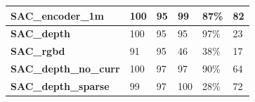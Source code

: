 \begin{table}[]
\begin{tabular}{l|l|l|l|l|l|}
    \multicolumn{1}{|l|}{\textbf{SAC\_encoder\_1m}}     & 100                                                                                         & 95                                                                                         & 99                                                                                          & 87\%                                                                                                     & 82                                                                                         \\ \hline
    \multicolumn{1}{|l|}{\textbf{SAC\_depth}}           & 100                                                                                         & 95                                                                                         & 95                                                                                          & 97\%                                                                                                     & 23                                                                                         \\ \hline
    \multicolumn{1}{|l|}{\textbf{SAC\_rgbd}}            & 91                                                                                          & 95                                                                                         & 46                                                                                          & 38\%                                                                                                     & 17                                                                                         \\ \hline
    \multicolumn{1}{|l|}{\textbf{SAC\_depth\_no\_curr}} & 100                                                                                         & 97                                                                                         & 97                                                                                          & 90\%                                                                                                     & 64                                                                                         \\ \hline
    \multicolumn{1}{|l|}{\textbf{SAC\_depth\_sparse}}   & 99                                                                                          & 97                                                                                         & 100                                                                                         & 28\%                                                                                                     & 72                                                                                         \\ \hline

\end{tabular}
\end{table}
